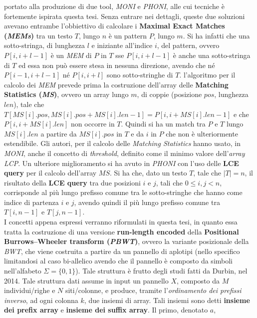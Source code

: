 \documentclass[a4paper,11pt, oneside]{article}
\begin{document}
portato alla produzione di due tool, \textit{MONI} e 
\textit{PHONI}, alle cui tecniche è fortemente ispirata questa tesi. Senza
entrare nei dettagli, queste due soluzioni avevano entrambe l'obbiettivo di
calcolare i \textbf{Maximal Exact Matches (\textit{MEMs})} tra un testo $T$,
lungo $n$ è un pattern $P$, lungo $m$. Si ha infatti che una sotto-stringa, di
lunghezza $l$ e iniziante all'indice $i$, del pattern, ovvero $P[i,i+l-1]$ è un
\textit{MEM} di $P$ in $T$ 
sse $P[i,i+l-1]$ è anche una sotto-stringa di $T$ ed essa non può essere stesa
in nessuna direzione, avendo che né $P[i-1,i+l-1]$ né $P[i,i+l]$ sono
sotto-stringhe di $T$. l'algoritmo per il calcolo dei \textit{MEM} prevede prima
la costruzione dell'array delle \textbf{Matching Statistics (\textit{MS})},
ovvero un array lungo $m$, di coppie (posizione $pos$, lunghezza $len$), tale
che 
$T[MS[i].pos,MS[i].pos+MS[i].len-1]=P[i,i+MS[i].len-1]$ e che $P[i,i+MS[i].len]$
non occorre in $T$. Quindi si ha un match tra $P$ e $T$ lungo $MS[i].len$ a
partire da $MS[i].pos$ in $T$ e da $i$ in $P$ che non è ulteriormente
estendibile. Gli autori, per il calcolo delle \textit{Matching Statistics} hanno
usato, in \textit{MONI}, anche il concetto di \textit{threshold}, definito come
il minimo valore dell'\textit{array LCP}. Un
ulteriore miglioramento si ha avuto in \textit{PHONI} con l'uso delle
\textbf{LCE query} per il calcolo dell'array $MS$. Si ha che, dato un testo $T$,
tale che $|T|=n$, il risultato della \textbf{LCE query} tra 
due posizioni $i$ e $j$, tali che $0\leq i,j<n$, corrisponde al più lungo
prefisso comune tra le sotto-stringhe che hanno come indice di partenza $i$ e
$j$, avendo quindi il più lungo prefisso comune tra $T[i,n-1]$ e
$T[j,n-1]$.\\
I concetti appena espressi verranno riformulati in questa tesi, in quanto essa
tratta la costruzione di una versione \textbf{run-length encoded} della
\textbf{Positional Burrows–Wheeler transform (\textit{PBWT})}, ovvero la
variante posizionale della \textit{BWT}, che viene costruita a partire da un
pannello di aplotipi (nello specifico limitandosi al caso bi-allelico avendo che
il pannello è composto da simboli nell'alfabeto $\Sigma=\{0,1\}$). Tale
struttura è frutto degli studi fatti da Durbin, nel 2014. Tale struttura dati
assume in input un pannello $X$, composto da $M$ individui/righe e $N$
siti/colonne, e produce, tramite l'\textit{ordinamento dei prefissi inverso}, ad
ogni colonna $k$, due insiemi di array. Tali insiemi sono detti \textbf{insieme
  dei prefix array} e \textbf{insieme dei suffix array}. Il primo, denotato $a$,
\end{document}
